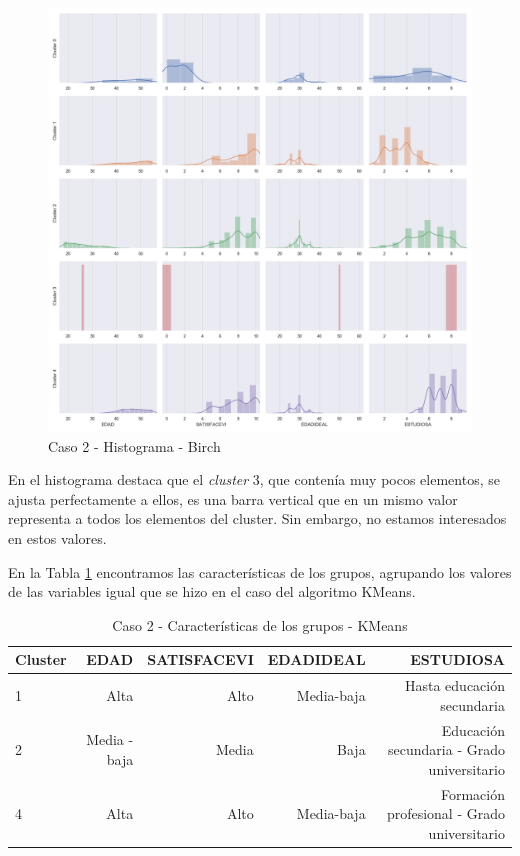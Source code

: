 \documentclass[a4paper, 20pt]{article}
\begin{document}
\begin{figure}[H]
    \centering
    \includegraphics[width=1\textwidth]{./caso2/Birch_distplot}
    \caption{Caso 2 - Histograma - Birch}
    \label{fig:birch_dist2}
\end{figure}

En el histograma destaca que el \textit{cluster} 3, que contenía muy pocos elementos, se ajusta perfectamente a ellos, es una barra vertical que en un mismo valor representa a todos los elementos del cluster. Sin embargo, no estamos interesados en estos valores.

En la Tabla \ref{tab:birch_carac2} encontramos las características de los grupos, agrupando los valores de las variables igual que se hizo en el caso del algoritmo KMeans.

\begin{table}[H]
\centering
\caption{Caso 2 - Características de los grupos - KMeans}
\label{tab:birch_carac2}
\begin{tabular}{lrrrr}
\toprule
Cluster & EDAD & SATISFACEVI & EDADIDEAL & ESTUDIOSA\\
\midrule
1 & Alta & Alto & Media-baja & Hasta educación secundaria \\
2 & Media - baja & Media & Baja & Educación secundaria - Grado universitario \\
4 & Alta & Alto & Media-baja & Formación profesional - Grado universitario \\
\bottomrule
\end{tabular}
\end{table}
\end{document}
